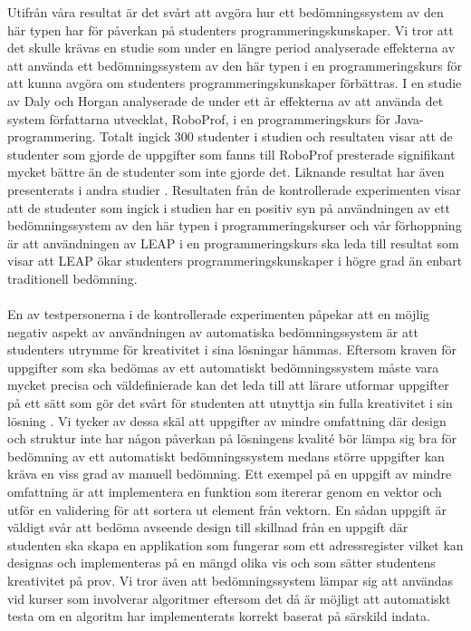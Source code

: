 \documentclass[a4paper,11pt]{article}
\begin{document}
{Utifrån våra resultat är det svårt att avgöra hur ett bedömningssystem av den här typen har för påverkan på studenters programmeringskunskaper. Vi tror att det skulle krävas en studie som under en längre period analyserade effekterna av att använda ett bedömningssystem av den här typen i en programmeringskurs för att kunna avgöra om studenters programmeringskunskaper förbättras. I en studie av Daly och Horgan \cite{roboprof_4} analyserade de under ett år effekterna av att använda det system författarna utvecklat, RoboProf, i en programmeringskurs för Java-programmering. Totalt ingick 300 studenter i studien och resultaten visar att de studenter som gjorde de uppgifter som fanns till RoboProf presterade signifikant mycket bättre än de studenter som inte gjorde det. Liknande resultat har även presenterats i andra studier \cite{higgins_coursemarker_12} \cite{japanerna_1}. Resultaten från de kontrollerade experimenten visar att de studenter som ingick i studien har en positiv syn på användningen av ett bedömningssystem av den här typen i programmeringskurser och vår förhoppning är att användningen av LEAP i en programmeringskurs ska leda till resultat som visar att LEAP ökar studenters programmeringskunskaper i högre grad än enbart traditionell bedömning. 
\\
\\
En av testpersonerna i de kontrollerade experimenten påpekar att en möjlig negativ aspekt av användningen av automatiska bedömningssystem är att studenters utrymme för kreativitet i sina lösningar hämmas. Eftersom kraven för uppgifter som ska bedömas av ett automatiskt bedömningssystem måste vara mycket precisa och väldefinierade kan det leda till att lärare utformar uppgifter på ett sätt som gör det svårt för studenten att utnyttja sin fulla kreativitet i sin lösning \cite{pieterse}. Vi tycker av dessa skäl att uppgifter av mindre omfattning där design och struktur inte har någon påverkan på lösningens kvalité bör lämpa sig bra för bedömning av ett automatiskt bedömningssystem medans större uppgifter kan kräva en viss grad av manuell bedömning. Ett exempel på en uppgift av mindre omfattning är att implementera en funktion som itererar genom en vektor och utför en validering för att sortera ut element från vektorn. En sådan uppgift är väldigt svår att bedöma avseende design till skillnad från en uppgift där studenten ska skapa en applikation som fungerar som ett adressregister vilket kan designas och implementeras på en mängd olika vis och som sätter studentens kreativitet på prov. Vi tror även att bedömningssystem lämpar sig att användas vid kurser som involverar algoritmer eftersom det då är möjligt att automatiskt testa om en algoritm har implementerats korrekt baserat på särskild indata.
}
\end{document}
